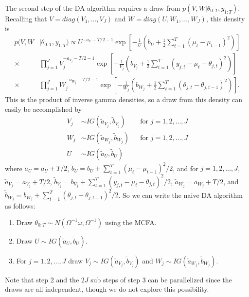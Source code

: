 \documentclass[graybox]{svmult}
\begin{document}
The second step of the DA algorithm requires a draw from $p(V,W|\theta_{0:T},y_{1:T})$. Recalling that $V=diag(V_1,\dots,V_J)$ and $W=diag(U,W_1,\dots,W_J)$, this density is
\begin{align*}
p(V,W&|\theta_{0:T},y_{1:T}) \propto U^{-a_{U}-T/2-1}\exp\left[-\frac{1}{U}\left(b_U + \frac{1}{2}\sum_{t=1}^T(\mu_t - \mu_{t-1})^2\right)\right]\\
\times&\prod_{j=1}^J V_j^{-a_{V_j} - T/2 - 1}\exp\left[-\frac{1}{V_j}\left(b_{V_j} + \frac{1}{2}\sum_{t=1}^T(y_{j,t} - \mu_t - \theta_{j,t})^2\right)\right] \\
\times& \prod_{j=1}^JW_j^{-a_{W_j} - T/2 - 1}\exp\left[-\frac{1}{W_j}\left(b_{W_j} + \frac{1}{2}\sum_{t=1}^T(\theta_{j,t} - \theta_{j,t-1})^2\right)\right].
\end{align*}
This is the product of inverse gamma densities, so a draw from this density can easily be accomplished by
\begin{align*}
V_j &\sim IG(\tilde{a}_{V_j},\tilde{b}_{V_j}) &&\mbox{for } j=1,2,\dots,J\\
W_j &\sim IG(\tilde{a}_{W_j},\tilde{b}_{W_j}) &&\mbox{for } j=1,2,\dots,J\\
U &\sim IG(\tilde{a}_{U},\tilde{b}_U) &&
\end{align*}
where $\tilde{a}_U = a_U + T/2$, $\tilde{b}_U = b_U + \sum_{t=1}^T(\mu_t - \mu_{t-1})^2/2$, and for $j=1,2,\dots,J$, $\tilde{a}_{V_j} = a_{V_j} + T/2$, $\tilde{b}_{V_j} = b_{V_j} + \sum_{t=1}^T(y_{j,t} - \mu_t - \theta_{j,t})^2/2$, $\tilde{a}_{W_j}=a_{W_j} + T/2$, and $\tilde{b}_{W_j} = b_{W_j} + \sum_{t=1}^T(\theta_{j,t} - \theta_{j,t-1})^2/2$. So we can write the naive DA algorithm as follows:
\begin{enumerate}
\item Draw $\theta_{0:T}\sim N(\Omega^{-1}\omega, \Omega^{-1})$ using the MCFA.
\item Draw $U\sim IG(\tilde{a}_U,\tilde{b}_U)$. 
\item For $j=1,2,\dots,J$ draw $V_j\sim IG(\tilde{a}_{V_j},\tilde{b}_{V_j})$ and $W_j\sim IG(\tilde{a}_{W_j},\tilde{b}_{W_j})$.
\end{enumerate}
Note that step 2 and the $2J$ sub steps of step 3 can be parallelized since the draws are all independent, though we do not explore this possibility.
\end{document}
